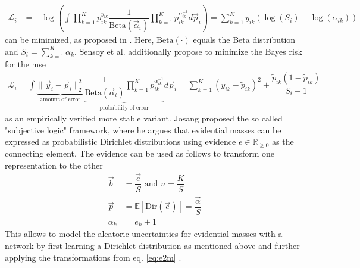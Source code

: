 \begin{align}
	\mathcal{L}_i &= -\log\left( \int\prod_{k=1}^{K}p_{ik}^{y_{ik}}\dfrac{1}{\mathrm{Beta}(\vec{\alpha}_i)}\prod_{k=1}^{K}p_{ik}^{\alpha_{ik}^{-1}}d\vec{p}_i \right)  = \sum_{k=1}^{K}y_{ik}(\log(S_i)-\log(\alpha_{ik}))	
\end{align}  
can be minimized, as proposed in \cite{wu2019quantifying,sensoy2018evidential}. Here, $\mathrm{Beta}(\cdot)$ equals the Beta distribution and $S_i = \sum_{k=1}^{K} \alpha_k$. Sensoy et al. \cite{sensoy2018evidential} additionally propose to minimize the Bayes risk for the \gls{mse}
\begin{align}
	\label{eq:bayes_risk_mse}
	\mathcal{L}_i = \int \underbrace{\| \vec{y}_i - \vec{p}_i\|^{2}_{2}}_{\text{amount of error}}\underbrace{\dfrac{1}{\mathrm{Beta}(\vec{\alpha}_i)}\prod_{k=1}^{K}p_{ik}^{\alpha_{ik}^{-1}}}_{\text{probability of error}}d\vec{p}_i = \sum_{k=1}^{K}(y_{ik}-\tilde{p}_{ik})^2 + \dfrac{\tilde{p}_{ik}(1-\tilde{p}_{ik})}{S_i+1}
\end{align} 
as an empirically verified more stable variant. Josang \cite{audun2018subjective} proposed the so called "subjective logic" framework, where he argues that evidential masses can be expressed as probabilistic Dirichlet distributions using evidence $e \in \mathbb{R}_{\geq 0}$ as the connecting element. The evidence can be used as follows to transform one representation to the other
\begin{align}
	\label{eq:e2m}
	\vec{b} &= \dfrac{\vec{e}}{S} \text{ and } u = \dfrac{K}{S}\\
	\label{eq:e2p}
	\vec{p} &= \mathbb{E}[\mathrm{Dir}(\vec{e})] = \dfrac{\vec{\alpha}}{S}\\
	\alpha_k &= e_k + 1
\end{align} 
This allows to model the aleatoric uncertainties for evidential masses with a network by first learning a Dirichlet distribution as mentioned above and further applying the transformations from eq. \eqref{eq:e2m} \cite{sensoy2018evidential}. 
%
